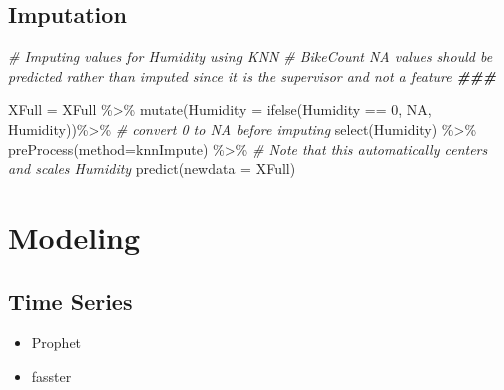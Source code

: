\documentclass[
]{article}
\newenvironment{Shaded}{\begin{snugshade}}{\end{snugshade}}
\newcommand{\AttributeTok}[1]{\textcolor[rgb]{0.77,0.63,0.00}{#1}}
\newcommand{\CommentTok}[1]{\textcolor[rgb]{0.56,0.35,0.01}{\textit{#1}}}
\newcommand{\ConstantTok}[1]{\textcolor[rgb]{0.00,0.00,0.00}{#1}}
\newcommand{\DecValTok}[1]{\textcolor[rgb]{0.00,0.00,0.81}{#1}}
\newcommand{\DocumentationTok}[1]{\textcolor[rgb]{0.56,0.35,0.01}{\textbf{\textit{#1}}}}
\newcommand{\FunctionTok}[1]{\textcolor[rgb]{0.00,0.00,0.00}{#1}}
\newcommand{\NormalTok}[1]{#1}
\newcommand{\OtherTok}[1]{\textcolor[rgb]{0.56,0.35,0.01}{#1}}
\newcommand{\SpecialCharTok}[1]{\textcolor[rgb]{0.00,0.00,0.00}{#1}}
\newcommand{\StringTok}[1]{\textcolor[rgb]{0.31,0.60,0.02}{#1}}
\providecommand{\tightlist}{%
  \setlength{\itemsep}{0pt}\setlength{\parskip}{0pt}}
\begin{document}
\hypertarget{imputation}{%
\subsection{Imputation}\label{imputation}}

\begin{Shaded}
\begin{Highlighting}[]
\CommentTok{\# Imputing values for Humidity using KNN}
\CommentTok{\# BikeCount NA values should be predicted rather than imputed since it is the supervisor and not a feature}
\DocumentationTok{\#\#\#}

\NormalTok{XFull }\OtherTok{=}\NormalTok{ XFull }\SpecialCharTok{\%\textgreater{}\%}
  \FunctionTok{mutate}\NormalTok{(}\AttributeTok{Humidity =} \FunctionTok{ifelse}\NormalTok{(Humidity }\SpecialCharTok{==} \DecValTok{0}\NormalTok{, }\ConstantTok{NA}\NormalTok{, Humidity))}\SpecialCharTok{\%\textgreater{}\%} \CommentTok{\# convert 0 to NA before imputing}
  \FunctionTok{select}\NormalTok{(Humidity) }\SpecialCharTok{\%\textgreater{}\%}
  \FunctionTok{preProcess}\NormalTok{(}\AttributeTok{method=}\StringTok{\textquotesingle{}knnImpute\textquotesingle{}}\NormalTok{) }\SpecialCharTok{\%\textgreater{}\%} \CommentTok{\# Note that this automatically centers and scales Humidity}
  \FunctionTok{predict}\NormalTok{(}\AttributeTok{newdata =}\NormalTok{ XFull)}
\end{Highlighting}
\end{Shaded}

\hypertarget{modeling}{%
\section{Modeling}\label{modeling}}

\hypertarget{time-series}{%
\subsection{Time Series}\label{time-series}}

\begin{itemize}
\tightlist
\item
  Prophet
\item
  fasster
\end{itemize}
\end{document}
